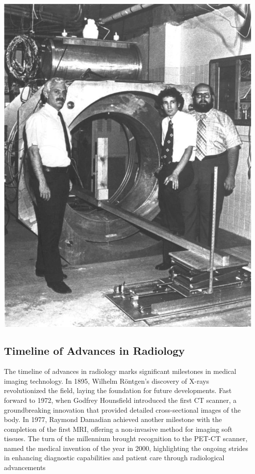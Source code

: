 \documentclass[a4paper,12pt]{report}
\begin{document}
\begin{center}
  \includegraphics[scale =0.3]{firstMRI.png}
  \label{firstMRI}
\end{center}

\subsection{Timeline of Advances in Radiology}
The timeline of advances in radiology marks significant milestones in medical imaging
technology. In 1895, Wilhelm Röntgen's discovery of X-rays revolutionized the field, laying the
foundation for future developments. Fast forward to 1972, when Godfrey Hounsfield introduced
the first CT scanner, a groundbreaking innovation that provided detailed cross-sectional images
of the body. In 1977, Raymond Damadian achieved another milestone with the completion of the
first MRI, offering a non-invasive method for imaging soft tissues. The turn of the millennium
brought recognition to the PET-CT scanner, named the medical invention of the year in 2000,
highlighting the ongoing strides in enhancing diagnostic capabilities and patient care through
radiological advancements
\end{document}
